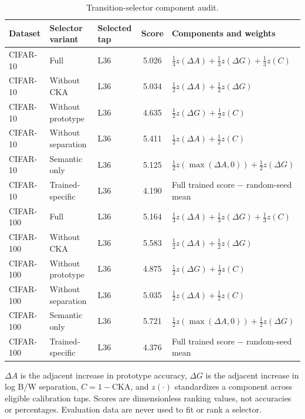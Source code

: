 \begin{table}[!htbp]
\centering
\begin{threeparttable}
\caption{Transition-selector component audit.}
\label{tab:pca-selector-main}
\footnotesize
\setlength{\tabcolsep}{3.4pt}
\renewcommand{\arraystretch}{1.05}
\begin{tabularx}{\linewidth}{@{}l Y l c Y@{}}
\toprule
Dataset & Selector variant & Selected tap & Score & Components and weights\\
\midrule
CIFAR-10 & Full & L36 & 5.026 & $\tfrac13 z(\Delta A)+\tfrac13 z(\Delta G)+\tfrac13 z(C)$\\
\thinrowrule
CIFAR-10 & Without CKA & L36 & 5.034 & $\tfrac12 z(\Delta A)+\tfrac12 z(\Delta G)$\\
\thinrowrule
CIFAR-10 & Without prototype & L36 & 4.635 & $\tfrac12 z(\Delta G)+\tfrac12 z(C)$\\
\thinrowrule
CIFAR-10 & Without separation & L36 & 5.411 & $\tfrac12 z(\Delta A)+\tfrac12 z(C)$\\
\thinrowrule
CIFAR-10 & Semantic only & L36 & 5.125 & $\tfrac12 z(\max(\Delta A,0))+\tfrac12 z(\Delta G)$\\
\thinrowrule
CIFAR-10 & Trained-specific & L36 & 4.190 & Full trained score $-$ random-seed mean\\
\midrule
CIFAR-100 & Full & L36 & 5.164 & $\tfrac13 z(\Delta A)+\tfrac13 z(\Delta G)+\tfrac13 z(C)$\\
\thinrowrule
CIFAR-100 & Without CKA & L36 & 5.583 & $\tfrac12 z(\Delta A)+\tfrac12 z(\Delta G)$\\
\thinrowrule
CIFAR-100 & Without prototype & L36 & 4.875 & $\tfrac12 z(\Delta G)+\tfrac12 z(C)$\\
\thinrowrule
CIFAR-100 & Without separation & L36 & 5.035 & $\tfrac12 z(\Delta A)+\tfrac12 z(C)$\\
\thinrowrule
CIFAR-100 & Semantic only & L36 & 5.721 & $\tfrac12 z(\max(\Delta A,0))+\tfrac12 z(\Delta G)$\\
\thinrowrule
CIFAR-100 & Trained-specific & L36 & 4.376 & Full trained score $-$ random-seed mean\\
\bottomrule
\end{tabularx}
\begin{tablenotes}[flushleft]\footnotesize
\item $\Delta A$ is the adjacent increase in prototype accuracy, $\Delta G$ is the adjacent increase in log B/W separation, $C=1-\mathrm{CKA}$, and $z(\cdot)$ standardizes a component across eligible calibration taps. Scores are dimensionless ranking values, not accuracies or percentages. Evaluation data are never used to fit or rank a selector.
\end{tablenotes}
\end{threeparttable}
\end{table}
